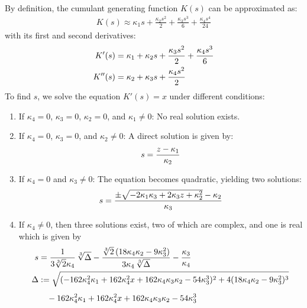 By definition, the cumulant generating function $K(s)$ can be approximated as:
\begin{align}
    K(s) \approx \kappa_1 s + \frac{\kappa_2 s^2}{2} + \frac{\kappa_3 s^3}{6} + \frac{\kappa_4 s^4}{24}
\end{align}
with its first and second derivatives:
\begin{align}
    K'(s) &= \kappa_1 + \kappa_2 s + \frac{\kappa_3 s^2}{2} + \frac{\kappa_4 s^3}{6} \notag \\
    K''(s) &= \kappa_2 + \kappa_3 s + \frac{\kappa_4 s^2}{2} \notag
\end{align}
To find $s$, we solve the equation $K'(s) = x$ under different conditions:
\begin{enumerate}
    \item If $\kappa_4 = 0$, $\kappa_3 = 0$, $\kappa_2 = 0$, and $\kappa_1 \neq 0$: No real solution exists.
    \item If $\kappa_4 = 0$, $\kappa_3 = 0$, and $\kappa_2 \neq 0$: A direct solution is given by:
    \begin{align}
        s = \frac{z-\kappa_1}{\kappa_2} \notag
    \end{align}
    \item If $\kappa_4 = 0$ and $\kappa_3 \neq 0$: The equation becomes quadratic, yielding two solutions:
    \begin{align}
        s = \frac{\pm\sqrt{-2\kappa_1\kappa_3 + 2\kappa_3 z + \kappa_2^2} - \kappa_2}{\kappa_3} \notag
    \end{align}
    \item If $\kappa_4 \neq 0$, then three solutions exist, two of which are complex, and one is real which is given by
    \begin{align}
        s &= \frac{1}{3\sqrt[3]{2}\kappa_4}\,\sqrt[3]{\Delta} - \frac{\sqrt[3]{2}\,(18\kappa_4\kappa_2-9\kappa_3^2)}{3\kappa_4\,\sqrt[3]{\Delta}} - \frac{\kappa_3}{\kappa_4} \notag \\
        \Delta &:= \sqrt{(-162\kappa_4^2\kappa_1 + 162\kappa_4^2x + 162\kappa_4\kappa_3\kappa_2 - 54\kappa_3^3)^2 + 4(18\kappa_4\kappa_2 - 9\kappa_3^2)^3} \notag\\[1ex]
        &\quad - 162\kappa_4^2\kappa_1 + 162\kappa_4^2x + 162\kappa_4\kappa_3\kappa_2 - 54\kappa_3^3 \notag
    \end{align}        
\end{enumerate}

